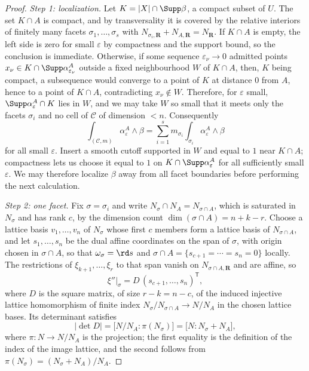 \begin{proof}
\emph{Step 1: localization.}  Let $K=|X|\cap\Supp\beta$, a compact subset of
$U$.  The set $K\cap A$ is compact, and by transversality it is covered by
the relative interiors of finitely many facets $\sigma_1,\ldots,\sigma_s$
with $N_{\sigma_i,\mathbf R}+N_{A,\mathbf R}=N_{\mathbf R}$.
If $K\cap A$ is empty, the left side is zero for small $\varepsilon$
by compactness and the support bound, so the conclusion is immediate.
Otherwise, if some
sequence $\varepsilon_\nu\to0$ admitted points
$x_\nu\in K\cap\Supp\alpha^A_{\varepsilon_\nu}$ outside a fixed
neighbourhood $W$ of $K\cap A$, then, $K$ being compact, a subsequence would
converge to a point of $K$ at distance $0$ from $A$, hence to a point of
$K\cap A$, contradicting $x_\nu\notin W$.  Therefore, for $\varepsilon$
small, $\Supp\alpha^A_\varepsilon\cap K$ lies in $W$, and we may take $W$ so
small that it meets only the facets $\sigma_i$ and no cell of $\mathscr C$
of dimension $<n$.  Consequently
\[
 \int_{(\mathscr C,m)}\alpha^A_\varepsilon\wedge\beta
 =\sum_{i=1}^sm_{\sigma_i}\int_{\sigma_i}
   \alpha^A_\varepsilon\wedge\beta
\]
for all small $\varepsilon$.  Insert a smooth cutoff supported in $W$
and equal to $1$ near $K\cap A$; compactness lets us choose it equal
to $1$ on $K\cap\Supp\alpha^A_\varepsilon$ for all sufficiently small
$\varepsilon$.  We may therefore localize $\beta$ away from all facet
boundaries before performing the next calculation.

\emph{Step 2: one facet.}  Fix $\sigma=\sigma_i$ and write
$N_\sigma\cap N_A=N_{\sigma\cap A}$, which is saturated in $N_\sigma$ and
has rank $c$, by the dimension count
$\dim(\sigma\cap A)=n+k-r$.  Choose a lattice basis $v_1,\ldots,v_n$ of
$N_\sigma$ whose first $c$ members form a lattice basis of
$N_{\sigma\cap A}$, and let $s_1,\ldots,s_n$ be the dual affine coordinates
on the span of $\sigma$, with origin chosen in $\sigma\cap A$, so that
$\omega_\sigma=\rd s$ and
$\sigma\cap A=\{s_{c+1}=\cdots=s_n=0\}$ locally.  The restrictions of
$\xi_{k+1},\ldots,\xi_r$ to that span vanish on $N_{\sigma\cap A,\mathbf R}$
and are affine, so
\[
 \xi''|_\sigma=D\,(s_{c+1},\ldots,s_n)^{\mathsf T},
\]
where $D$ is the square matrix, of size $r-k=n-c$, of the induced
injective lattice homomorphism of finite index
$N_\sigma/N_{\sigma\cap A}\to N/N_A$ in the chosen lattice bases.  Its
determinant satisfies
\[
 |\det D|
 =\bigl[N/N_A:\pi(N_\sigma)\bigr]
 =\bigl[N:N_\sigma+N_A\bigr],
\]
where $\pi:N\to N/N_A$ is the projection; the first equality is the
definition of the index of the image lattice, and the second follows from
$\pi(N_\sigma)=(N_\sigma+N_A)/N_A$.


\end{proof}
